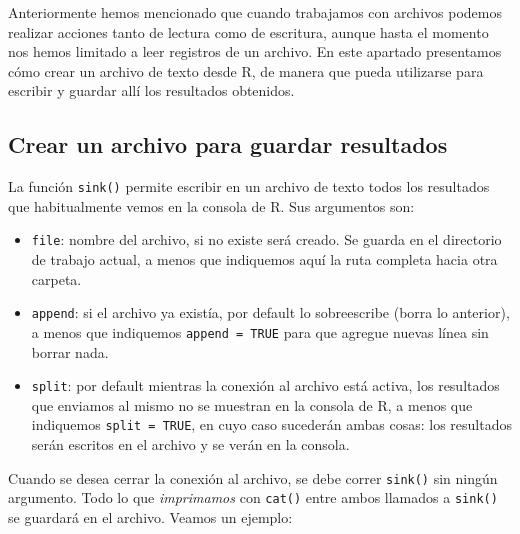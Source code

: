 \documentclass[
]{book}
\providecommand{\tightlist}{%
  \setlength{\itemsep}{0pt}\setlength{\parskip}{0pt}}
\begin{document}
Anteriormente hemos mencionado que cuando trabajamos con archivos podemos realizar acciones tanto de lectura como de escritura, aunque hasta el momento nos hemos limitado a leer registros de un archivo. En este apartado presentamos cómo crear un archivo de texto desde R, de manera que pueda utilizarse para escribir y guardar allí los resultados obtenidos.

\hypertarget{crear-un-archivo-para-guardar-resultados}{%
\subsection{Crear un archivo para guardar resultados}\label{crear-un-archivo-para-guardar-resultados}}

La función \texttt{sink()} permite escribir en un archivo de texto todos los resultados que habitualmente vemos en la consola de R. Sus argumentos son:

\begin{itemize}
\tightlist
\item
  \texttt{file}: nombre del archivo, si no existe será creado. Se guarda en el directorio de trabajo actual, a menos que indiquemos aquí la ruta completa hacia otra carpeta.
\item
  \texttt{append}: si el archivo ya existía, por default lo sobreescribe (borra lo anterior), a menos que indiquemos \texttt{append\ =\ TRUE} para que agregue nuevas línea sin borrar nada.
\item
  \texttt{split}: por default mientras la conexión al archivo está activa, los resultados que enviamos al mismo no se muestran en la consola de R, a menos que indiquemos \texttt{split\ =\ TRUE}, en cuyo caso sucederán ambas cosas: los resultados serán escritos en el archivo y se verán en la consola.
\end{itemize}

Cuando se desea cerrar la conexión al archivo, se debe correr \texttt{sink()} sin ningún argumento. Todo lo que \emph{imprimamos} con \texttt{cat()} entre ambos llamados a \texttt{sink()} se guardará en el archivo. Veamos un ejemplo:
\end{document}
